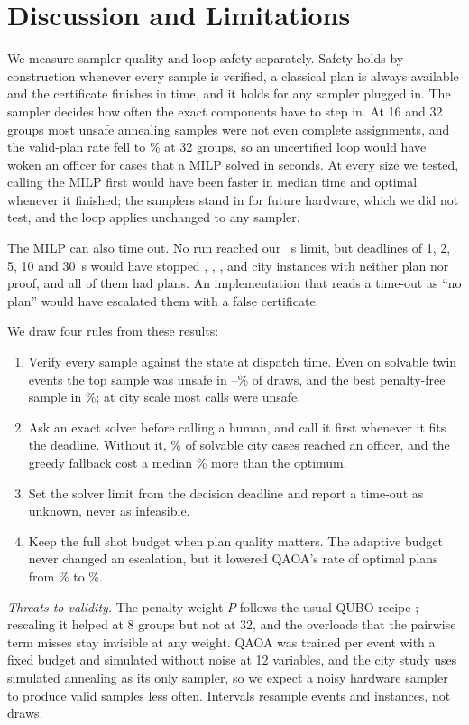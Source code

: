 \documentclass[conference]{IEEEtran}
\begin{document}
\section{Discussion and Limitations}
We measure sampler quality and loop safety separately. Safety holds by construction whenever every sample is verified, a classical plan is always available and the certificate finishes in time, and it holds for any sampler plugged in. The sampler decides how often the exact components have to step in. At 16 and 32 groups most unsafe annealing samples were not even complete assignments, and the valid-plan rate fell to \CitySAFoundThirtyTwo\% at 32 groups, so an uncertified loop would have woken an officer for cases that a MILP solved in seconds. At every size we tested, calling the MILP first would have been faster in median time and optimal whenever it finished; the samplers stand in for future hardware, which we did not test, and the loop applies unchanged to any sampler.

The MILP can also time out. No run reached our \CityLimitS~s limit, but deadlines of 1, 2, 5, 10 and 30~s would have stopped \DlOne, \DlTwo, \DlFive, \DlTen{} and \DlThirty{} city instances with neither plan nor proof, and all of them had plans. An implementation that reads a time-out as ``no plan'' would have escalated them with a false certificate.

We draw four rules from these results:
\begin{enumerate}
\item Verify every sample against the state at dispatch time. Even on solvable twin events the top sample was unsafe in \TwinRawFeasSA--\TwinRawFeasQ\% of draws, and the best penalty-free sample in \BasePfQSol\%; at city scale most calls were unsafe.
\item Ask an exact solver before calling a human, and call it first whenever it fits the deadline. Without it, \CityFalseEsc\% of solvable city cases reached an officer, and the greedy fallback cost a median \CityGreedyGap\% more than the optimum.
\item Set the solver limit from the decision deadline and report a time-out as unknown, never as infeasible.
\item Keep the full shot budget when plan quality matters. The adaptive budget never changed an escalation, but it lowered QAOA's rate of optimal plans from \FixedOptQ\% to \AdaptOptQ\%.
\end{enumerate}

\textit{Threats to validity.} The penalty weight $P$ follows the usual QUBO recipe \cite{Glover2019}; rescaling it helped at 8 groups but not at 32, and the overloads that the pairwise term misses stay invisible at any weight. QAOA was trained per event with a fixed budget and simulated without noise at 12 variables, and the city study uses simulated annealing as its only sampler, so we expect a noisy hardware sampler to produce valid samples less often. Intervals resample events and instances, not draws.
\end{document}

